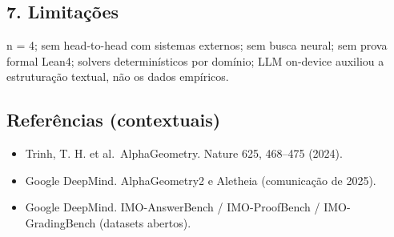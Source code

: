 \documentclass[11pt,a4paper]{article}
\providecommand{\tightlist}{\setlength{\itemsep}{0pt}\setlength{\parskip}{0pt}}
\begin{document}
\subsection{7. Limitações}\label{limitauxe7uxf5es}

n = 4; sem head-to-head com sistemas externos; sem busca neural; sem
prova formal Lean4; solvers determinísticos por domínio; LLM on-device
auxiliou a estruturação textual, não os dados empíricos.

\subsection{Referências (contextuais)}\label{referuxeancias-contextuais}

\begin{itemize}
\tightlist
\item
  Trinh, T. H. et al.~AlphaGeometry. Nature 625, 468--475 (2024).
\item
  Google DeepMind. AlphaGeometry2 e Aletheia (comunicação de 2025).
\item
  Google DeepMind. IMO-AnswerBench / IMO-ProofBench / IMO-GradingBench
  (datasets abertos).
\end{itemize}
\end{document}
